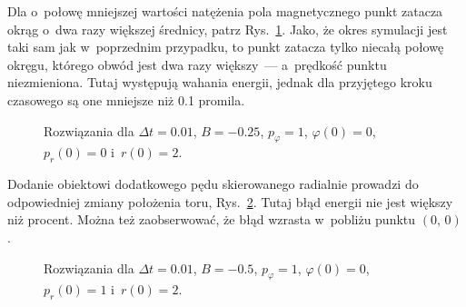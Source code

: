\documentclass[a4paper; 12pt]{article}
\begin{document}
Dla o~połowę mniejszej wartości natężenia pola magnetycznego punkt zatacza
okrąg o~dwa razy większej średnicy, patrz Rys.~\ref{fig:data2}.
Jako, że okres symulacji jest taki sam jak w~poprzednim przypadku, to punkt
zatacza tylko niecałą połowę okręgu, którego obwód jest dwa razy większy~---
a~prędkość punktu niezmieniona.
Tutaj występują wahania energii, jednak dla przyjętego kroku czasowego są one
mniejsze niż \num{0.1} promila.
\begin{figure}
    \centering
    \caption{Rozwiązania dla $\Delta t=\num{0.01}$, $B=\num{-0.25}$,
        $p_\varphi=\num{1}$, $\varphi(0)=\num{0}$, $p_r(0)=\num{0}$
        i~$r(0)=\num{2}$.}
    \label{fig:data2}
\end{figure}

Dodanie obiektowi dodatkowego pędu skierowanego radialnie prowadzi do
odpowiedniej zmiany położenia toru, Rys.~\ref{fig:data3}.
Tutaj błąd energii nie jest większy niż procent.
Można też zaobserwować, że błąd wzrasta w~pobliżu punktu $(0,\,0)$.
\begin{figure}
    \centering
    \caption{Rozwiązania dla $\Delta t=\num{0.01}$, $B=\num{-0.5}$,
        $p_\varphi=\num{1}$, $\varphi(0)=\num{0}$, $p_r(0)=\num{1}$
        i~$r(0)=\num{2}$.}
    \label{fig:data3}
\end{figure}
\end{document}
